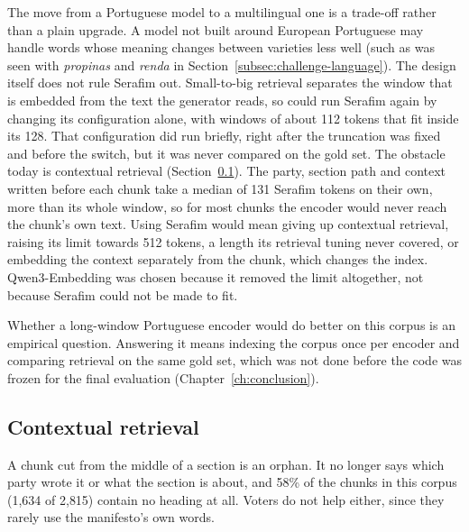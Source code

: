 The move from a Portuguese model to a multilingual one is a trade-off rather
than a plain upgrade. A model not built around European Portuguese may handle
words whose meaning changes between varieties less well (such as was seen with
\textit{propinas} and \textit{renda} in Section~\ref{subsec:challenge-language}).
The design itself does not rule Serafim out. Small-to-big retrieval separates
the window that is embedded from the text the generator reads, so \sysname{}
could run Serafim again by changing its configuration alone, with windows of
about 112 tokens that fit inside its 128. That configuration did run briefly,
right after the truncation was fixed and before the switch, but it was never
compared on the gold set. The obstacle today is contextual retrieval
(Section~\ref{subsec:contextual}). The party, section path and context
written before each chunk take a median of 131 Serafim tokens on their own,
more than its whole window, so for most chunks the encoder would never reach
the chunk's own text. Using Serafim would mean giving up contextual retrieval,
raising its limit towards 512 tokens, a length its retrieval tuning never
covered, or embedding the context separately from the chunk, which changes the
index. Qwen3-Embedding was chosen because it removed the limit altogether, not
because Serafim could not be made to fit.

Whether a long-window Portuguese encoder would do better on this corpus is an
empirical question. Answering it means indexing the corpus once per encoder and
comparing retrieval on the same gold set, which was not done before the code
was frozen for the final evaluation (Chapter~\ref{ch:conclusion}).

\subsection{Contextual retrieval} \label{subsec:contextual}

A chunk cut from the middle of a section is an orphan. It no longer says which
party wrote it or what the section is about, and 58\% of the chunks in this
corpus (1{,}634 of 2{,}815) contain no heading at all. Voters do not help
either, since they rarely use the manifesto's own words.

